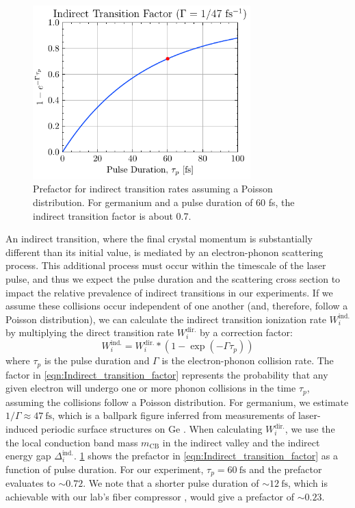 \begin{figure}
	\centering
	\includegraphics[width=0.75\textwidth]{figures/chap4/Indirect_transition_factor.pdf}
	\caption{Prefactor for indirect transition rates assuming a Poisson distribution. For germanium and a pulse duration of 60 fs, the indirect transition factor is about 0.7.}
	\label{fig:Indirect_transition_factor}
\end{figure}

An indirect transition, where the final crystal momentum is substantially different than its initial value, is mediated by an electron-phonon scattering process. This additional process must occur within the timescale of the laser pulse, and thus we expect the pulse duration and the scattering cross section to impact the relative prevalence of indirect transitions in our experiments. If we assume these collisions occur independent of one another (and, therefore, follow a Poisson distribution), we can calculate the indirect transition ionization rate $W_i^{\textrm{ind.}}$ by multiplying the direct transition rate $W_i^{\textrm{dir.}}$ by a correction factor:
\begin{equation}
W_i^{\textrm{ind.}} = W_i^{\textrm{dir.}} * (1 - \exp(-\Gamma \tau_p))
\label{eqn:Indirect_transition_factor}
\end{equation}
where $\tau_p$ is the pulse duration and $\Gamma$ is the electron-phonon collision rate. The factor in \cref{eqn:Indirect_transition_factor} represents the probability that any given electron will undergo one or more phonon collisions in the time $\tau_p$, assuming the collisions follow a Poisson distribution. For germanium, we estimate $1/\Gamma \approx 47 \ \textrm{fs}$, which is a ballpark figure inferred from measurements of laser-induced periodic surface structures on Ge \cite{austinSemiconductorSurfaceModification2017}. When calculating $W_i^{\textrm{dir.}}$, we use the the local conduction band mass $m_{\textrm{CB}}$ in the indirect valley and the indirect energy gap $\Delta_i^{\textrm{ind.}}$. \cref{fig:Indirect_transition_factor} shows the prefactor in \cref{eqn:Indirect_transition_factor} as a function of pulse duration. For our experiment, $\tau_p = 60 \ \textrm{fs}$ and the prefactor evaluates to $\sim 0.72$. We note that a shorter pulse duration of $\sim 12 \ \textrm{fs}$, which is achievable with our lab's fiber compressor \cite{zhangAtomicMolecularDynamics2015}, would give a prefactor of $\sim 0.23$.

